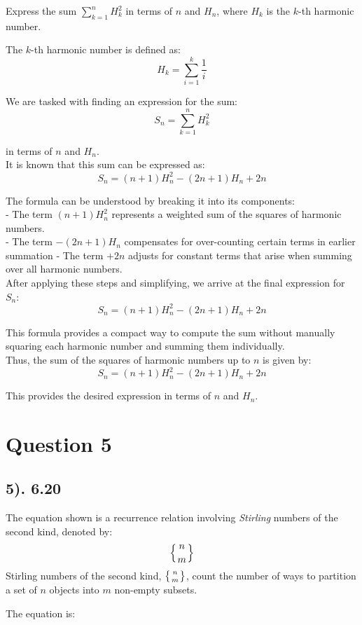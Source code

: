 \documentclass[12pt]{article}
\begin{document}
Express the sum \( \sum_{k=1}^{n} H_k^2 \) in terms of \( n \) and \( H_n \), where \( H_k \) is the $k$-th harmonic number.

The $k$-th harmonic number is defined as:
\[
H_k = \sum_{i=1}^{k} \frac{1}{i}
\]

We are tasked with finding an expression for the sum:
\[
S_n = \sum_{k=1}^{n} H_k^2
\]

in terms of \( n \) and \( H_n \).\\

It is known that this sum can be expressed as:
\[
S_n = (n+1)H_n^2 - (2n+1)H_n + 2n
\]

The formula can be understood by breaking it into its components:\\
- The term \( (n+1)H_n^2 \) represents a weighted sum of the squares of harmonic numbers.\\
- The term \( -(2n+1)H_n \) compensates for over-counting certain terms in earlier summation
- The term \( +2n \) adjusts for constant terms that arise when summing over all harmonic numbers.\\

After applying these steps and simplifying, we arrive at the final expression for \( S_n \):
\[
S_n = (n+1)H_n^2 - (2n+1)H_n + 2n
\]

This formula provides a compact way to compute the sum without manually squaring each harmonic number and summing them individually.\\

Thus, the sum of the squares of harmonic numbers up to \( n \) is given by:
\[
S_n = (n+1)H_n^2 - (2n+1)H_n + 2n
\]

This provides the desired expression in terms of \( n \) and \( H_n \).

\section*{Question 5}
\subsection*{5). 6.20}

The equation shown is a recurrence relation involving \textit{Stirling} numbers of the second kind, denoted by:
\[
\left\{ n \atop m \right\}
\]
Stirling numbers of the second kind, \( \left\{ n \atop m \right\} \), count the number of ways to partition a set of \( n \) objects into \( m \) non-empty subsets.

The equation is:
\end{document}
